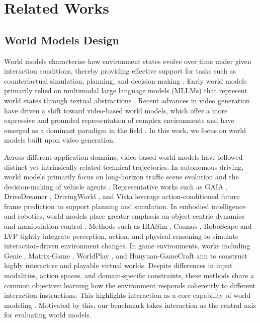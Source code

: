 \section{Related Works}

\subsection{World Models Design}
World models characterize how environment states evolve over time under given interaction conditions, thereby providing effective support for tasks such as counterfactual simulation, planning, and decision-making \cite{ha2018world}.
Early world models primarily relied on multimodal large language models (MLLMs) \cite{hurst2024gpt,Qwen3-VL,bai2025univg,chu2025gpg} that represent world states through textual abstractions \cite{yang2024rila,shridhar2020alfworld}.  Recent advances in video generation \cite{sora_initial,wan2025,mao2025omni,wu2026latent,zhu2026artifact} have driven a shift toward video-based world models, which offer a more expressive and grounded representation of complex environments and have emerged as a dominant paradigm in the field \cite{ding2025understanding,zhu2024sora,zheng2026code2world}. In this work, we focus on world models built upon video generation.


Across different application domains, video-based world models have followed distinct yet intrinsically related technical trajectories. In autonomous driving, world models primarily focus on long-horizon traffic scene evolution and the decision-making of vehicle agents \cite{feng2025survey}. Representative works such as GAIA \cite{hu2023gaia}, DriveDreamer \cite{wang2024drivedreamer}, DrivingWorld \cite{hu2024drivingworld}, and Vista \cite{gao2024vista} leverage action-conditioned future frame prediction to support planning and simulation. 
In embodied intelligence and robotics, world models place greater emphasis on object-centric dynamics and manipulation control \cite{long2025survey}. Methods such as IRASim \cite{zhu2024irasim}, Cosmos \cite{agarwal2025Cosmos}, RoboScape \cite{shang2025roboscape} and LVP \cite{chen2025large} tightly integrate perception, action, and physical reasoning to simulate interaction-driven environment changes. 
In game environments, works including Genie \cite{bruce2024genie,parker2024genie}, Matrix-Game \cite{zhang2025matrix,he2025matrix}, WorldPlay \cite{sun2025worldplay}, and Hunyuan-GameCraft \cite{li2025hunyuan,tang2025hunyuan} aim to construct highly interactive and playable virtual worlds. Despite differences in input modalities, action spaces, and domain-specific constraints, these methods share a common objective: learning how the environment responds coherently to different interaction instructions. This highlights interaction as a core capability of world modeling \cite{ding2025understanding,agarwal2025Cosmos}.
Motivated by this, our benchmark takes interaction as the central axis for evaluating world models.

